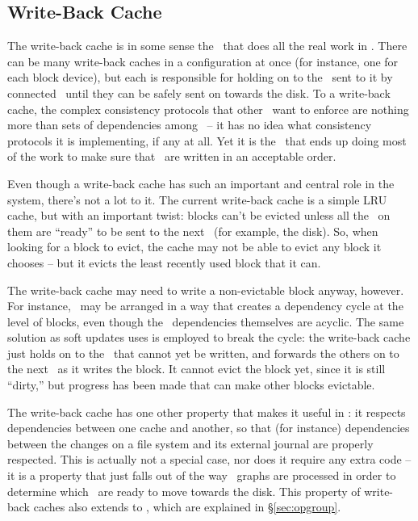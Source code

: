 \subsection{Write-Back Cache}
\label{sec:modules:wbcache}


The write-back cache is in some sense the \module\ that does all the real work
in \Kudos. There can be many write-back caches in a configuration at once (for
instance, one for each block device), but each is responsible for holding on to
the \chdescs\ sent to it by connected \modules\ until they can be safely sent on
towards the disk. To a write-back cache, the complex consistency protocols that
other \modules\ want to enforce are nothing more than sets of dependencies among
\chdescs\ -- it has no idea what consistency protocols it is implementing, if
any at all. Yet it is the \module\ that ends up doing most of the work to make
sure that \chdescs\ are written in an acceptable order.

Even though a write-back cache has such an important and central role in the
system, there's not a lot to it. The current write-back cache is a simple LRU
cache, but with an important twist: blocks can't be evicted unless all the
\chdescs\ on them are ``ready'' to be sent to the next \module\ (for example,
the disk). So, when looking for a block to evict, the cache may not be able to
evict any block it chooses -- but it evicts the least recently used block that
it can.

The write-back cache may need to write a non-evictable block anyway, however.
For instance, \chdescs\ may be arranged in a way that creates a dependency cycle
at the level of blocks, even though the \chdesc\ dependencies themselves are
acyclic. The same solution as soft updates uses is employed to break the cycle:
the write-back cache just holds on to the \chdescs\ that cannot yet be written,
and forwards the others on to the next \module\ as it writes the block. It
cannot evict the block yet, since it is still ``dirty,'' but progress has been
made that can make other blocks evictable.

The write-back cache has one other property that makes it useful in \Kudos: it
respects dependencies between one cache and another, so that (for instance)
dependencies between the changes on a file system and its external journal are
properly respected. This is actually not a special case, nor does it require any
extra code -- it is a property that just falls out of the way \chdesc\ graphs
are processed in order to determine which \chdescs\ are ready to move towards
the disk. This property of write-back caches also extends to \opgroups, which
are explained in \S\ref{sec:opgroup}.

